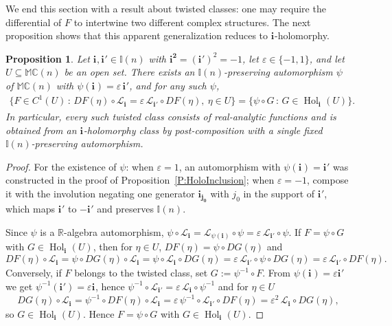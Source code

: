 \documentclass[12pt]{amsart}
\theoremstyle{plain}
\newtheorem{proposition}[theorem]{Proposition}
\theoremstyle{definition}
\numberwithin{equation}{section}
\newcommand{\im}[1]{\mathbf{ i_{#1}}}
\newcommand{\ims}[1]{\mathbf{ i_{#1}^2}}
\newcommand{\mC}{\mathbb{C}}
\newcommand{\mM}{\mathbb{M}}
\newcommand{\mI}{\mathbb{I}}
\newcommand{\cL}{\mathcal{L}}
\DeclareMathOperator{\hol}{Hol}
\begin{document}
We end this section with a result about twisted classes: one may require the differential of $F$ to intertwine two different complex structures. The next proposition shows that this apparent generalization reduces to $\im{}$-holomorphy.

    \begin{proposition}\label{P:Twisted}
    Let $\im{} , \im{}' \in \mI(n)$ with $\ims{} = (\im{}')^2 = -1$, let $\varepsilon \in \{ -1 , 1 \}$, and let $U \subseteq \mM \mC(n)$ be an open set. There exists an $\mI(n)$-preserving automorphism $\psi$ of $\mM \mC(n)$ with $\psi (\im{}) = \varepsilon\, \im{}'$, and for any such $\psi$,
        \begin{align*}
        \{ F \in C^1 (U)\, :\, DF (\eta ) \circ \cL_{\im{}} = \varepsilon\, \cL_{\im{}'} \circ DF (\eta ) , \ \eta \in U \} = \{ \psi \circ G\, :\, G \in \hol_{\im{}} (U) \}.
        \end{align*}
    In particular, every such twisted class consists of real-analytic functions and is obtained from an $\im{}$-holomorphy class by post-composition with a single fixed $\mI(n)$-preserving automorphism.
    \end{proposition}

    \begin{proof}
    For the existence of $\psi$: when $\varepsilon = 1$, an automorphism with $\psi (\im{}) = \im{}'$ was constructed in the proof of Proposition~\ref{P:HoloInclusion}; when $\varepsilon = -1$, compose it with the involution negating one generator $\im{j_0}$ with $j_0$ in the support of $\im{}'$, which maps $\im{}'$ to $-\im{}'$ and preserves $\mI(n)$.

    Since $\psi$ is a $\mathbb R$-algebra automorphism, $\psi \circ \cL_{\im{}} = \cL_{\psi (\im{})} \circ \psi = \varepsilon\, \cL_{\im{}'} \circ \psi$. If $F = \psi \circ G$ with $G \in \hol_{\im{}} (U)$, then for $\eta \in U$, $DF (\eta) = \psi \circ DG (\eta )$ and
    \[
    DF(\eta)\circ\cL_{\im{}}=\psi\circ DG(\eta)\circ\cL_{\im{}}=\psi\circ\cL_{\im{}}\circ DG(\eta) = \varepsilon\, \cL_{\im{}'} \circ \psi \circ DG (\eta ) = \varepsilon\, \cL_{\im{}'} \circ DF (\eta ).
    \]
    Conversely, if $F$ belongs to the twisted class, set $G := \psi^{-1} \circ F$. From $\psi (\im{}) = \varepsilon \im{}'$ we get $\psi^{-1} (\im{}') = \varepsilon \im{}$, hence $\psi^{-1} \circ \cL_{\im{}'} = \varepsilon\, \cL_{\im{}} \circ \psi^{-1}$ and for $\eta \in U$ 
    \[
    DG (\eta ) \circ \cL_{\im{}} = \psi^{-1} \circ DF (\eta ) \circ \cL_{\im{}} = \varepsilon\, \psi^{-1} \circ \cL_{\im{}'} \circ DF (\eta ) = \varepsilon^2\, \cL_{\im{}} \circ DG (\eta ),
    \]
    so $G \in \hol_{\im{}} (U)$. Hence $F = \psi \circ G$ with $G \in \hol_{\im{}} (U)$. 
    \end{proof}
\end{document}

